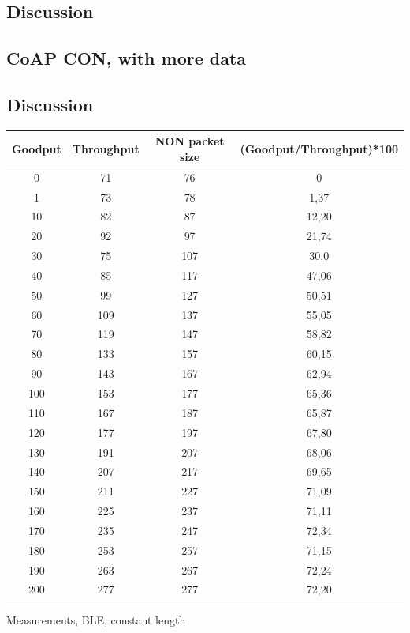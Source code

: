 \subsection{Discussion}

\subsection{CoAP CON, with more data}

\subsection{Discussion}


\begin{center}
 \begin{tabular}{||c c c c||} 
 \hline
 Goodput & Throughput & NON packet size & (Goodput/Throughput)*100 \\ [0.5ex] 
 \hline\hline
 0 & 71 & 76 & 0 \\ 
 \hline
 1 & 73 & 78 & 1,37 \\
 \hline
 10 & 82 & 87 & 12,20 \\
 \hline
 20 & 92 & 97 & 21,74 \\
  \hline
 30 & 75 & 107 & 30,0 \\
  \hline
 40 & 85 & 117 & 47,06 \\
  \hline
 50 & 99 & 127 & 50,51 \\
  \hline
 60 & 109 & 137 & 55,05 \\
  \hline
 70 & 119 & 147 & 58,82 \\
  \hline
 80 & 133 & 157 & 60,15 \\
  \hline
 90 & 143 & 167 & 62,94 \\
 \hline
 100 & 153 & 177 & 65,36 \\
 \hline
 110 & 167 & 187 & 65,87 \\
 \hline
 120 & 177 & 197 & 67,80 \\
 \hline
 130 & 191 & 207 & 68,06 \\
 \hline
 140 & 207 & 217 & 69,65 \\
 \hline
 150 & 211 & 227 & 71,09 \\
 \hline
 160 & 225 & 237 & 71,11 \\
 \hline
 170 & 235 & 247 & 72,34 \\
 \hline
 180 & 253 & 257 & 71,15 \\
 \hline
 190 & 263 & 267 & 72,24 \\
 \hline
 200 & 277 & 277 & 72,20 \\ [1ex] 
 \hline
\end{tabular}
\caption{Measurements, BLE, constant length}
\label{table:1}
\end{center}

